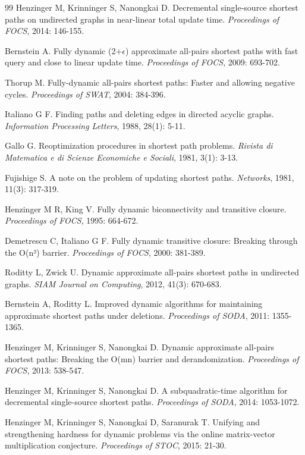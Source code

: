 \documentclass[12pt,a4paper]{ctexart}
\begin{document}
\begin{thebibliography}{99}
 Henzinger M, Krinninger S, Nanongkai D. Decremental single-source shortest paths on undirected graphs in near-linear total update time. \textit{Proceedings of FOCS}, 2014: 146-155.

 Bernstein A. Fully dynamic (2+$\epsilon$) approximate all-pairs shortest paths with fast query and close to linear update time. \textit{Proceedings of FOCS}, 2009: 693-702.

 Thorup M. Fully-dynamic all-pairs shortest paths: Faster and allowing negative cycles. \textit{Proceedings of SWAT}, 2004: 384-396.

 Italiano G F. Finding paths and deleting edges in directed acyclic graphs. \textit{Information Processing Letters}, 1988, 28(1): 5-11.

 Gallo G. Reoptimization procedures in shortest path problems. \textit{Rivista di Matematica e di Scienze Economiche e Sociali}, 1981, 3(1): 3-13.

 Fujishige S. A note on the problem of updating shortest paths. \textit{Networks}, 1981, 11(3): 317-319.

 Henzinger M R, King V. Fully dynamic biconnectivity and transitive closure. \textit{Proceedings of FOCS}, 1995: 664-672.

 Demetrescu C, Italiano G F. Fully dynamic transitive closure: Breaking through the O(n²) barrier. \textit{Proceedings of FOCS}, 2000: 381-389.

 Roditty L, Zwick U. Dynamic approximate all-pairs shortest paths in undirected graphs. \textit{SIAM Journal on Computing}, 2012, 41(3): 670-683.

 Bernstein A, Roditty L. Improved dynamic algorithms for maintaining approximate shortest paths under deletions. \textit{Proceedings of SODA}, 2011: 1355-1365.

 Henzinger M, Krinninger S, Nanongkai D. Dynamic approximate all-pairs shortest paths: Breaking the O(mn) barrier and derandomization. \textit{Proceedings of FOCS}, 2013: 538-547.

 Henzinger M, Krinninger S, Nanongkai D. A subquadratic-time algorithm for decremental single-source shortest paths. \textit{Proceedings of SODA}, 2014: 1053-1072.

 Henzinger M, Krinninger S, Nanongkai D, Saranurak T. Unifying and strengthening hardness for dynamic problems via the online matrix-vector multiplication conjecture. \textit{Proceedings of STOC}, 2015: 21-30.


\end{thebibliography}
\end{document}
